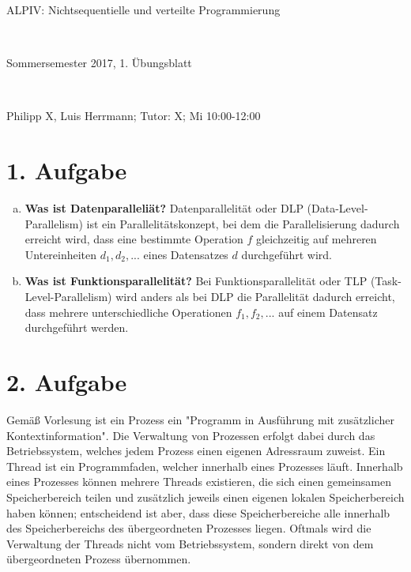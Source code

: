 \documentclass[numbers=noendperiod]{scrartcl}
\begin{document}
	
	
\hrulefill
\begin{center}
	\bfseries %
	\sffamily %
	\begin{huge}
		ALPIV: Nichtsequentielle und verteilte Programmierung
	\end{huge}\\
	\begin{Large}
		Sommersemester 2017, 1. Übungsblatt
	\end{Large}\\
	\begin{small}
		Philipp X, Luis Herrmann; Tutor: X; Mi 10:00-12:00
	\end{small}
	
	\vspace{-10pt}
\end{center}
\hrulefill

\section*{1. Aufgabe}
\begin{enumerate}[a)]
	\item \textbf{Was ist Datenparalleliät?} Datenparallelität oder DLP (Data-Level-Parallelism) ist ein Parallelitätskonzept, bei dem die Parallelisierung dadurch erreicht wird, dass eine bestimmte Operation $f$ gleichzeitig auf mehreren Untereinheiten $d_1,d_2,...$ eines Datensatzes $d$ durchgeführt wird.
	\item \textbf{Was ist Funktionsparallelität?} Bei Funktionsparallelität oder TLP (Task-Level-Parallelism) wird anders als bei DLP die Parallelität dadurch erreicht, dass mehrere unterschiedliche Operationen $f_1,f_2,...$ auf einem Datensatz durchgeführt werden.
\end{enumerate}

\section*{2. Aufgabe}
Gemäß Vorlesung ist ein Prozess ein "Programm in Ausführung mit zusätzlicher Kontextinformation". Die Verwaltung von Prozessen erfolgt dabei durch das Betriebssystem, welches jedem Prozess einen eigenen Adressraum zuweist. Ein Thread ist ein Programmfaden, welcher innerhalb eines Prozesses läuft. Innerhalb eines Prozesses können mehrere Threads existieren, die sich einen gemeinsamen Speicherbereich teilen und zusätzlich jeweils einen eigenen lokalen Speicherbereich haben können; entscheidend ist aber, dass diese Speicherbereiche alle innerhalb des Speicherbereichs des übergeordneten Prozesses liegen. Oftmals wird die Verwaltung der Threads nicht vom Betriebssystem, sondern direkt von dem übergeordneten Prozess übernommen. 
\end{document}
